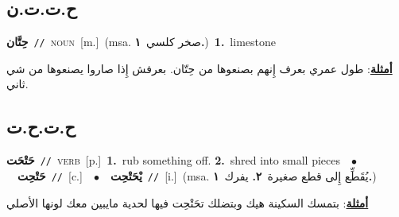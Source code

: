 \documentclass[10pt,a4paper,twoside]{article} %
\begin{document}
\begin{multicols}{2}
\vspace{-3mm}
\subsection*{\color{blue}\foreignlanguage{arabic}{ح.ت.ت.ن}\color{blue}{ (ntws)}} 

{\setlength\topsep{0pt}\textbf{\foreignlanguage{arabic}{حِتَّان}}\ {\color{gray}\texttt{//}\color{black}}\ \textsc{noun}\ [m.]\ \color{gray}(msa. \foreignlanguage{arabic}{صخر كلسي}~\foreignlanguage{arabic}{\textbf{١.}})\color{black}\ \textbf{1.}~limestone\  \begin{flushright}\color{gray}\foreignlanguage{arabic}{\textbf{\underline{\foreignlanguage{arabic}{أمثلة}}}: طول عمري بعرف إِنهم بصنعوها من حِتّان. بعرفش إِذا صاروا يصنعوها من شي ثاني.}\end{flushright}\color{black}} \vspace{2mm}

\vspace{-3mm}
\subsection*{\color{blue}\foreignlanguage{arabic}{ح.ت.ح.ت}\color{blue}{}} 

{\setlength\topsep{0pt}\textbf{\foreignlanguage{arabic}{حَتْحَت}}\ {\color{gray}\texttt{//}\color{black}}\ \textsc{verb}\ [p.]\ \textbf{1.}~rub something off.  \textbf{2.}~shred into small pieces\ \ $\bullet$\ \ \setlength\topsep{0pt}\textbf{\foreignlanguage{arabic}{حَتْحِت}}\ {\color{gray}\texttt{//}\color{black}}\ [c.]\ \ $\bullet$\ \ \setlength\topsep{0pt}\textbf{\foreignlanguage{arabic}{يْحَتْحِت}}\ {\color{gray}\texttt{//}\color{black}}\ [i.]\ \color{gray}(msa. \foreignlanguage{arabic}{يُقَطِّع إِلى قطع صغيرة}~\foreignlanguage{arabic}{\textbf{٢.}}  \foreignlanguage{arabic}{يفرك}~\foreignlanguage{arabic}{\textbf{١.}})\color{black}\  \begin{flushright}\color{gray}\foreignlanguage{arabic}{\textbf{\underline{\foreignlanguage{arabic}{أمثلة}}}: بتمسك السكينة هيك وبتضلك تحَتْحِت فيها لحدية مايبين معك لونها الأصلي}\end{flushright}\color{black}} \vspace{2mm}


\end{multicols}
\end{document}
